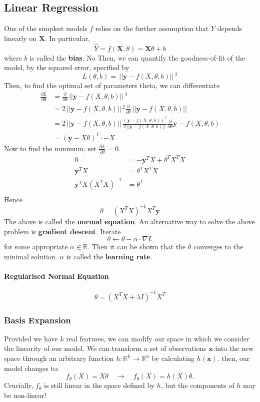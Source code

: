 \documentclass{article}
\renewcommand{\vec}[1]{\mathbf{#1}}
\renewcommand{\|}{\,\,|\,\,}
\newcommand{\norm}[1]{\,||#1||\,}
\newcommand{\diff}[2]{\frac{\partial #1}{\partial #2}}
\newcommand{\Reals}{\mathbb{R}}
\begin{document}
\subsection{Linear Regression}
One of the simplest models $f$ relies on the further assumption that $Y$ depends
linearly on $\vec{X}$. In particular,
\[
  \hat{Y} = f(\vec{X}, \theta) = \vec{X}\theta + b
\]
where $b$ is called the \textbf{bias}. No
Then, we can quantify the goodness-of-fit of the model, by the squared
error, specified by
\[
  L(\theta, b) = \norm{\vec{y} - f(X, \theta, b)}^2 
\]
Then, to find the optimal set of parameters theta, we can differentiate 
\begin{align*}
  \diff{L}{\theta} &= \diff{}{\theta}{\norm{\vec{y} - f(X, \theta, b)}^2 } \\
                   &= 2 \norm{\vec{y} - f(X, \theta, b)}^2 \diff{}{\theta}\norm{\vec{y} - f(X, \theta, b)}  \\
                   &= 2 \norm{\vec{y} - f(X, \theta, b)} \frac{(\vec{y} - f(X, \theta, b))^T}{2\norm{\vec{y} - f(X, \theta, b)}}\diff{}{\theta}\vec{y} - f(X, \theta, b)  \\
                   &= (\vec{y} - X\theta)^T \cdot -X
\end{align*}
Now to find the minimum, set $\diff{L}{\theta} = 0$.
\begin{align*}
  0 &= -\vec{y}^TX + \theta^TX^TX \\
  \vec{y}^TX &= \theta^TX^TX \\
  \vec{y}^TX(X^TX)^{-1} &= \theta^T \\
\end{align*}
Hence
\[
  \theta = (X^TX)^{-1}X^T\vec{y}
\]
The above is called the \textbf{normal equation}.
An alternative way to solve the above problem is \textbf{gradient descent}.
Iterate
\[
  \theta \leftarrow \theta - \alpha \cdot \nabla L
\]
for some appropriate $\alpha \in \Reals$. Then it can be shown that the $\theta$ converges
to the minimal solution. $\alpha$ is called the \textbf{learning rate}.
\paragraph{Regularised Normal Equation}
\[
  \theta = (X^TX + \lambda I)^{-1}X^T
\]
\subsubsection{Basis Expansion}
Provided we have $k$ real features, we can modify our space in which we consider
the linearity of our model. We can transform a set of observations $\vec{x}$ into the new
space through an arbitrary function $h: \Reals^k \to \Reals^n$ by calculating
$h(\vec{x})$.
then, our model changes to:
\[
  f_\theta(X) = X\theta \quad \to \quad f_\theta(X) = h(X)\theta.
\]
Crucially, $f_\theta$ is still linear in the space defined by $h$, but the
components of $h$ may be non-linear!
\end{document}
